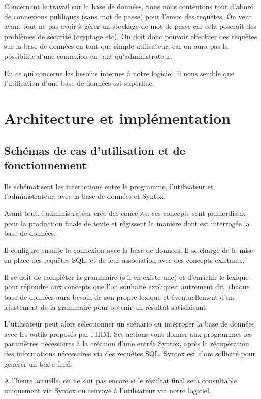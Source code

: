 \documentclass[12pt]{report}
\begin{document}
Concernant le travail sur la base de données, nous nous contentons tout
d'abord de connexions publiques (sans mot de passe) pour l'envoi des
requêtes. On veut avant tout ne pas avoir à gérer un stockage de mot de
passe car cela poserait des problèmes de sécurité (cryptage etc).
On doit donc pouvoir effectuer des requêtes sur la base de données en
tant que simple utilisateur, car on aura pas la possibilité d'une
connexion en tant qu'administrateur.

En ce qui concerne les besoins internes à notre logiciel, il nous semble
que l'utilisation d'une base de données est superflue.  


\chapter{Architecture et implémentation}

\section{Schémas de cas d'utilisation et de fonctionnement}


Ils schématisent les interactions entre le programme, l'utilisateur et l'administrateur, avec la base de données et Syntox.

Avant tout, l'administrateur crée des concepts: ces concepts sont primordiaux pour la production finale de texte et régissent la manière dont est interrogée la base de données.

Il configure ensuite la connexion avec la base de données. Il se charge de la mise en place des requêtes SQL, et de leur association avec des concepts existants.

Il se doit de compléter la grammaire (s'il en existe une) et d'enrichir le lexique pour répondre aux concepts que l'on souhaite expliquer; autrement dit, chaque base de données aura besoin de son propre lexique et éventuellement d'un ajustement de la grammaire pour obtenir un résultat satisfaisant.

L'utilisateur peut alors sélectionner un scénario ou interroger la base de données avec les outils proposés par l'IHM. Ses actions vont donner aux programmes les paramètres nécessaires à la création d'une entrée Syntox, après la récupération des informations nécessaires via des requêtes SQL. Syntox est alors sollicité pour générer un texte final.

A l'heure actuelle, on ne sait pas encore si le résultat final sera consultable uniquement via Syntox ou renvoyé à l'utilisateur via notre logiciel.
\end{document}
